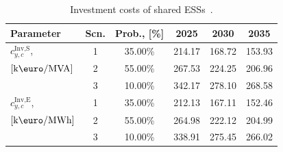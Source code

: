 \begin{table}[htbp!]
    \centering
    \caption{Investment costs of shared ESSs~\cite{nrel_ess_costs}.}
    \begin{tabular}{lcc ccc}
        \toprule
        Parameter & Scn. & Prob., [\%] & 2025 & 2030 & 2035 \\ 
        \midrule
        $c^\text{Inv,S}_{y,c}$,     & 1 & 35.00\% & 214.17 & 168.72 & 153.93\\
        $\left[\text{k\euro/MVA}\right]$ & 2 & 55.00\% & 267.53 & 224.25 & 206.96\\
        ~                           & 3 & 10.00\% & 342.17 & 278.10 & 268.58\\
        \midrule
        $c^\text{Inv,E}_{y,c}$, & 1 & 35.00\% & 212.13 & 167.11 & 152.46\\
        $\left[\text{k\euro/MWh}\right]$ & 2 & 55.00\% & 264.98 & 222.12 & 204.99\\
        ~                           & 3 & 10.00\% & 338.91 & 275.45 & 266.02\\
        \bottomrule
    \end{tabular}
    \label{tab:investment_cost}
\end{table}
